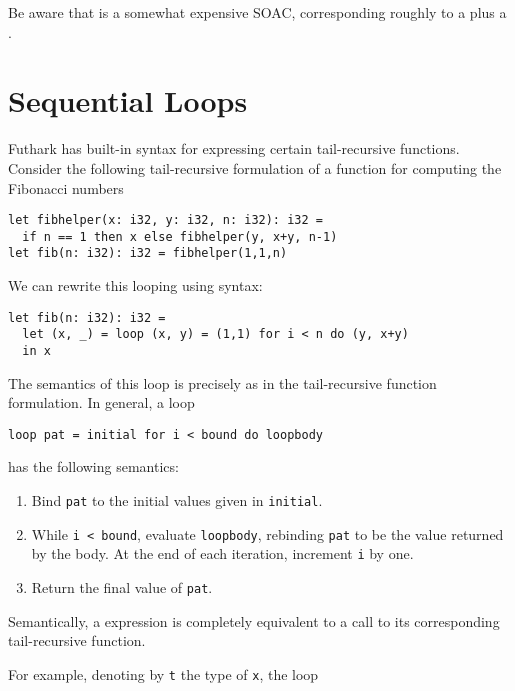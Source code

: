 \documentclass[oneside,11pt]{book}
\begin{document}


\noindent
Be aware that  is a somewhat expensive SOAC,
corresponding roughly to a  plus a .

\section{Sequential Loops}
\label{sec:sequential-loops}

Futhark has built-in syntax for expressing certain tail-recursive
functions.  Consider the following tail-recursive formulation of a
function for computing the Fibonacci numbers

\begin{lstlisting}
let fibhelper(x: i32, y: i32, n: i32): i32 =
  if n == 1 then x else fibhelper(y, x+y, n-1)
let fib(n: i32): i32 = fibhelper(1,1,n)
\end{lstlisting}

We can rewrite this looping using  syntax:

\begin{lstlisting}
let fib(n: i32): i32 =
  let (x, _) = loop (x, y) = (1,1) for i < n do (y, x+y)
  in x
\end{lstlisting}

The semantics of this loop is precisely as in the tail-recursive function
formulation.  In general, a loop

\begin{lstlisting}
loop pat = initial for i < bound do loopbody
\end{lstlisting}

\noindent
has the following semantics:

\begin{enumerate}
\item Bind \texttt{pat} to the initial values given in
  \texttt{initial}.
\item While \texttt{i < bound}, evaluate \texttt{loopbody}, rebinding
  \texttt{pat} to be the value returned by the body.  At the end of
  each iteration, increment \texttt{i} by one.
\item Return the final value of \texttt{pat}.
\end{enumerate}

Semantically, a  expression is completely equivalent to a
call to its corresponding tail-recursive function.

For example, denoting by \texttt{t} the type of \texttt{x}, the
loop
\end{document}
